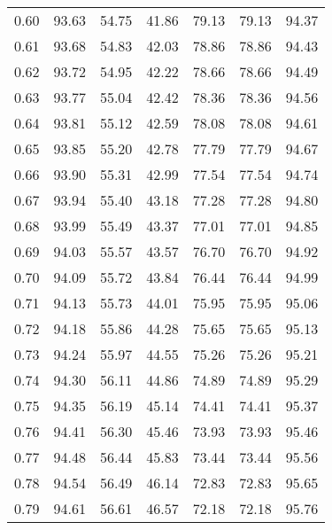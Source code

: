 \begin{tabular}{|c|c|c|c|c|c|c|}
      0.60 &     93.63 &     54.75 &      41.86 &   79.13 &      79.13 &         94.37 \\
      0.61 &     93.68 &     54.83 &      42.03 &   78.86 &      78.86 &         94.43 \\
      0.62 &     93.72 &     54.95 &      42.22 &   78.66 &      78.66 &         94.49 \\
      0.63 &     93.77 &     55.04 &      42.42 &   78.36 &      78.36 &         94.56 \\
      0.64 &     93.81 &     55.12 &      42.59 &   78.08 &      78.08 &         94.61 \\
      0.65 &     93.85 &     55.20 &      42.78 &   77.79 &      77.79 &         94.67 \\
      0.66 &     93.90 &     55.31 &      42.99 &   77.54 &      77.54 &         94.74 \\
      0.67 &     93.94 &     55.40 &      43.18 &   77.28 &      77.28 &         94.80 \\
      0.68 &     93.99 &     55.49 &      43.37 &   77.01 &      77.01 &         94.85 \\
      0.69 &     94.03 &     55.57 &      43.57 &   76.70 &      76.70 &         94.92 \\
      0.70 &     94.09 &     55.72 &      43.84 &   76.44 &      76.44 &         94.99 \\
      0.71 &     94.13 &     55.73 &      44.01 &   75.95 &      75.95 &         95.06 \\
      0.72 &     94.18 &     55.86 &      44.28 &   75.65 &      75.65 &         95.13 \\
      0.73 &     94.24 &     55.97 &      44.55 &   75.26 &      75.26 &         95.21 \\
      0.74 &     94.30 &     56.11 &      44.86 &   74.89 &      74.89 &         95.29 \\
      0.75 &     94.35 &     56.19 &      45.14 &   74.41 &      74.41 &         95.37 \\
      0.76 &     94.41 &     56.30 &      45.46 &   73.93 &      73.93 &         95.46 \\
      0.77 &     94.48 &     56.44 &      45.83 &   73.44 &      73.44 &         95.56 \\
      0.78 &     94.54 &     56.49 &      46.14 &   72.83 &      72.83 &         95.65 \\
      0.79 &     94.61 &     56.61 &      46.57 &   72.18 &      72.18 &         95.76 \\

\end{tabular}
